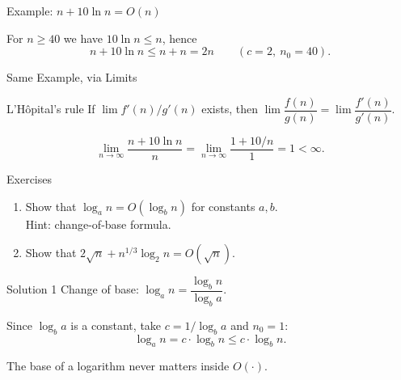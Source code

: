 \documentclass[10pt,aspectratio=169]{beamer}
\begin{document}
\begin{frame}{Example: $n + 10\ln n = O(n)$}
  \begin{center}
  \end{center}

  For $n \ge 40$ we have $10 \ln n \le n$, hence
  \[
    n + 10\ln n \le n + n = 2n
    \qquad (c = 2,\ n_0 = 40).
  \]
\end{frame}

\begin{frame}{Same Example, via Limits}
  \begin{block}{L'H\^opital's rule}
    If $\lim f'(n)/g'(n)$ exists, then $\lim \dfrac{f(n)}{g(n)} = \lim \dfrac{f'(n)}{g'(n)}$.
  \end{block}

  \bigskip
  \[
    \lim_{n \to \infty} \frac{n + 10\ln n}{n}
    = \lim_{n \to \infty} \frac{1 + 10/n}{1}
    = 1 < \infty.
  \]
\end{frame}

\begin{frame}{Exercises}
  \begin{enumerate}
    \item Show that $\log_a n = O(\log_b n)$ for constants $a, b$.\\
      {\small Hint: change-of-base formula.}
    \bigskip
    \item Show that $2\sqrt{n} + n^{1/3}\log_2 n = O(\sqrt{n})$.
  \end{enumerate}
\end{frame}

\begin{frame}{Solution 1}
  Change of base: $\log_a n = \dfrac{\log_b n}{\log_b a}$.

  \bigskip
  Since $\log_b a$ is a \alert{constant}, take $c = 1/\log_b a$ and $n_0 = 1$:
  \[
    \log_a n = c \cdot \log_b n \le c \cdot \log_b n.
  \]

  \bigskip
  \begin{center}
    \small The base of a logarithm never matters inside $O(\cdot)$.
  \end{center}
\end{frame}
\end{document}
